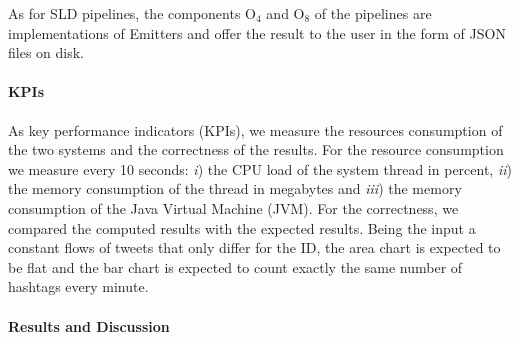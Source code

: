 As for SLD pipelines, the components O$_4$ and O$_8$ of the \sti pipelines are implementations of \textsf{Emitter}s and offer the result to the user in the form of JSON files on disk.

\paragraph{KPIs}
As key performance indicators (KPIs), we measure  the resources consumption of the two systems and the correctness of the results. For the resource consumption we measure every 10 seconds: \textit{i}) the CPU load of the system thread in percent, \textit{ii}) the memory consumption of the thread in megabytes and \textit{iii}) the memory consumption of the Java Virtual Machine (JVM). For the correctness, we compared the computed results with the expected results. Being the input a constant flows of tweets that only differ for the ID, the area chart is expected to be flat and the bar chart is expected to count exactly the same number of hashtags every minute.

\paragraph{Results and Discussion}\label{sec:comp-mod-eval-performace-res}

